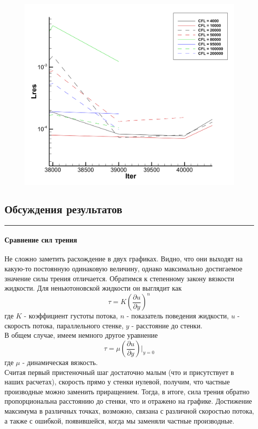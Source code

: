 \documentclass[12pt,a4paper, titlepage]{article}
\begin{document}
\begin{figure}[H]
	\centering
	\includegraphics[width = 1.0\textwidth]{ans_3_end.png}
\end{figure}

\subsection*{Обсуждения результатов}
\noindent\rule{\textwidth}{1pt}
\paragraph{Сравнение сил трения}
Не сложно заметить расхождение в двух графиках. Видно, что они выходят на какую-то постоянную одинаковую величину, однако максимально достигаемое значение силы трения отличается. Обратимся к степенному закону вязкости жидкости. Для неньютоновской жидкости он выглядит как
\begin{equation}
	\tau = K (\frac{\partial u}{\partial y})^n
\end{equation}
где $K$ - коэффициент густоты потока, $n$ - показатель поведения жидкости, $u$ - скорость потока, параллельного стенке, $y$ - расстояние до стенки.
\\
В общем случае, имеем немного другое уравнение
\begin{equation}
	\tau = \mu (\frac{\partial u}{\partial y})|_{y = 0}
\end{equation}
где $\mu$ - динамическая вязкость.
\\
Считая первый пристеночный шаг достаточно малым (что и присутствует в наших расчетах), скорость прямо у стенки нулевой, получим, что частные производные можно заменить приращением. Тогда, в итоге, сила трения обратно пропорциональна расстоянию до стенки, что и отражено на графике. Достижение максимума в различных точках, возможно, связана с различной скоростью потока, а также с ошибкой, появившейся, когда мы заменяли частные производные.
\end{document}

